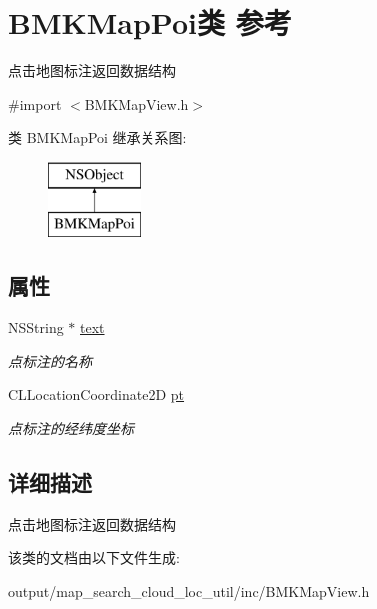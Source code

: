 \hypertarget{interface_b_m_k_map_poi}{\section{B\+M\+K\+Map\+Poi类 参考}
\label{interface_b_m_k_map_poi}
}


点击地图标注返回数据结构  




{\ttfamily \#import $<$B\+M\+K\+Map\+View.\+h$>$}

类 B\+M\+K\+Map\+Poi 继承关系图\+:\begin{figure}[H]
\begin{center}
\leavevmode
\includegraphics[height=2.000000cm]{interface_b_m_k_map_poi}
\end{center}
\end{figure}
\subsection*{属性}
\begin{DoxyCompactItemize}
\item 
\hypertarget{interface_b_m_k_map_poi_a5d5c19bd352dcab43167d97aa47ea38d}{N\+S\+String $\ast$ \hyperlink{interface_b_m_k_map_poi_a5d5c19bd352dcab43167d97aa47ea38d}{text}}\label{interface_b_m_k_map_poi_a5d5c19bd352dcab43167d97aa47ea38d}

\begin{DoxyCompactList}\small\item\em 点标注的名称 \end{DoxyCompactList}\item 
\hypertarget{interface_b_m_k_map_poi_a771c0672bbe2dd1dc526003717bbcec1}{C\+L\+Location\+Coordinate2\+D \hyperlink{interface_b_m_k_map_poi_a771c0672bbe2dd1dc526003717bbcec1}{pt}}\label{interface_b_m_k_map_poi_a771c0672bbe2dd1dc526003717bbcec1}

\begin{DoxyCompactList}\small\item\em 点标注的经纬度坐标 \end{DoxyCompactList}\end{DoxyCompactItemize}


\subsection{详细描述}
点击地图标注返回数据结构 

该类的文档由以下文件生成\+:\begin{DoxyCompactItemize}
\item 
output/map\+\_\+search\+\_\+cloud\+\_\+loc\+\_\+util/inc/B\+M\+K\+Map\+View.\+h\end{DoxyCompactItemize}
